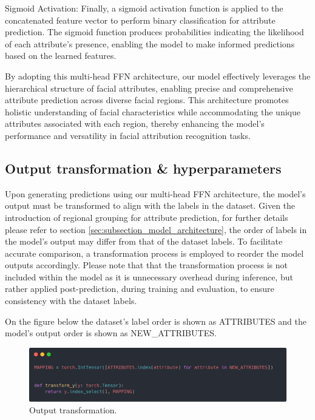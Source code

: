 \documentclass[a4paper,oneside]{article}
\begin{document}
Sigmoid Activation: Finally, a sigmoid activation function is applied to the concatenated feature vector to perform binary classification for attribute prediction.
The sigmoid function produces probabilities indicating the likelihood of each attribute's presence, enabling the model to make informed predictions based on the learned features.

By adopting this multi-head FFN architecture, our model effectively leverages the hierarchical structure of facial attributes, enabling precise and comprehensive attribute prediction across diverse facial regions.
This architecture promotes holistic understanding of facial characteristics while accommodating the unique attributes associated with each region, thereby enhancing the model's performance and versatility in facial attribution recognition tasks.

\subsection{Output transformation \& hyperparameters}
\label{sec:subsection_output_transformation}

Upon generating predictions using our multi-head FFN architecture, the model's output must be transformed to align with the labels in the dataset.
Given the introduction of regional grouping for attribute prediction, for further details please refer to section \ref{sec:subsection_model_architecture}, the order of labels in the model's output may differ from that of the dataset labels.
To facilitate accurate comparison, a transformation process is employed to reorder the model outputs accordingly.
Please note that that the transformation process is not included within the model as it is unnecessary overhead during inference, but rather applied post-prediction, during training and evaluation, to ensure consistency with the dataset labels.

On the figure below the dataset's label order is shown as ATTRIBUTES and the model's output order is shown as NEW\_ATTRIBUTES.

\begin{figure}[h]
  \includegraphics[width=\textwidth]{OutputTransformation.png}
  \centering
  \caption{Output transformation.}
  \centering
\end{figure}
\end{document}
